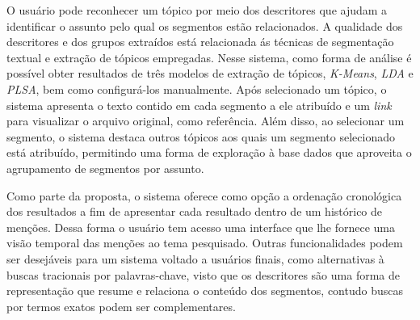 O usuário pode reconhecer um tópico por meio dos descritores que ajudam a identificar o assunto pelo qual os segmentos estão relacionados. A qualidade dos descritores e dos grupos extraídos está relacionada ás técnicas de segmentação textual e extração de tópicos empregadas. Nesse sistema, como forma de análise é possível obter resultados de três modelos de extração de tópicos, \textit{K-Means}, \textit{LDA} e \textit{PLSA}, bem como configurá-los manualmente. 
Após selecionado um tópico, o sistema apresenta o texto contido em cada segmento a ele atribuído e um \textit{link} para visualizar o arquivo original, como referência. Além disso, ao selecionar um segmento, o sistema destaca outros tópicos aos quais um segmento selecionado está atribuído, permitindo uma forma de exploração à base dados que aproveita o agrupamento de segmentos por assunto.


Como parte da proposta, o sistema oferece como opção a ordenação cronológica dos resultados a fim de apresentar cada resultado dentro de um histórico de menções. Dessa forma o usuário tem acesso uma interface que lhe fornece uma visão temporal das menções ao tema pesquisado.
Outras funcionalidades podem ser desejáveis para um sistema voltado a usuários finais, como alternativas à buscas tracionais por palavras-chave, visto que os descritores são uma forma de representação que resume e relaciona o conteúdo dos segmentos, contudo buscas por termos exatos podem ser complementares. 





